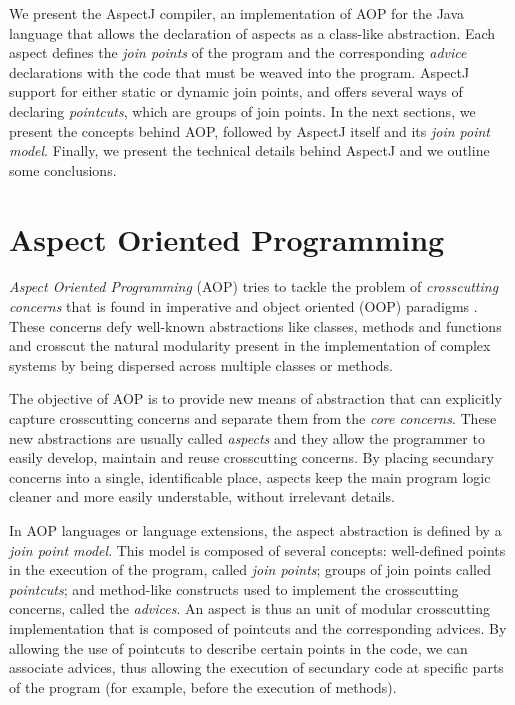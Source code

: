 \documentclass{template}
\begin{document}
We present the AspectJ compiler, an implementation of AOP for the Java language that allows the declaration
of aspects as a class-like abstraction. Each aspect defines the \emph{join points} of the program and the corresponding
\emph{advice} declarations with the code that must be weaved into the program. AspectJ support for either static or dynamic join points,
and offers several ways of declaring \emph{pointcuts}, which are groups of join points.
In the next sections, we present the concepts behind AOP, followed by
AspectJ itself and its \emph{join point model}. Finally, we present the technical details
behind AspectJ and we outline some conclusions.

\section{Aspect Oriented Programming}

\emph{Aspect Oriented Programming} (AOP) tries to tackle the problem of \emph{crosscutting concerns}
that is found in imperative and object oriented (OOP) paradigms \cite{Kiczales97aspect-orientedprogramming}.
These concerns defy well-known abstractions like classes, methods and functions and crosscut the
natural modularity present in the implementation of complex systems by being dispersed
across multiple classes or methods. \cite{Kiczales01anoverview}


The objective of AOP is to provide new means of abstraction that can explicitly capture crosscutting concerns
and separate them from the \emph{core concerns}. These new abstractions are usually called \emph{aspects}
and they allow the programmer to easily develop, maintain and reuse crosscutting concerns. By placing
secundary concerns into a single, identificable place, aspects keep the main program logic cleaner and more easily
understable, without irrelevant details.

In AOP languages or language extensions, the aspect abstraction is defined by a \emph{join point model}.
This model is composed of several concepts: well-defined points in the execution of the program,
called \emph{join points}; groups of join points called \emph{pointcuts}; and method-like constructs used to
implement the crosscutting concerns, called the \emph{advices}. An aspect is thus an unit of modular
crosscutting implementation that is composed of pointcuts and the corresponding advices. By allowing the
use of pointcuts to describe certain points in the code, we can associate advices, thus allowing the execution
of secundary code at specific parts of the program (for example, before the execution of methods).
\end{document}
